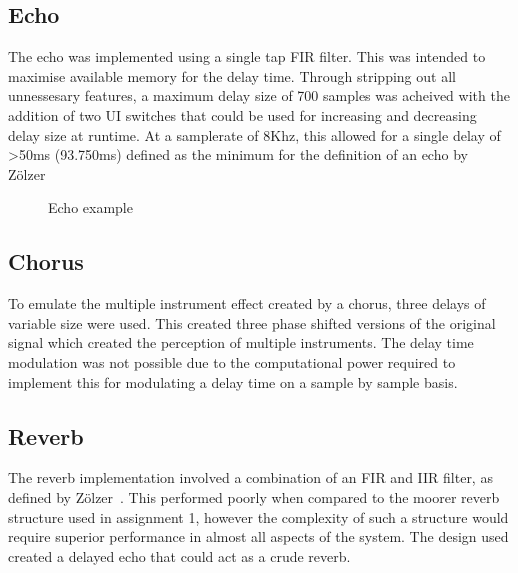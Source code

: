 \documentclass[titlepage]{scrartcl}
\begin{document}
    \subsection{Echo}
    The echo was implemented using a single tap FIR filter. This was intended
    to maximise available memory for the delay time. Through stripping out all
    unnessesary features, a maximum delay size of 700 samples was acheived with
    the addition of two UI switches that could be used for increasing and
    decreasing delay size at runtime.  At a samplerate of 8Khz, this allowed
    for a single delay of \textgreater50ms (93.750ms) defined as the minimum
    for the definition of an echo
    by Z{\"o}lzer~\citeyearpar[p.]{zolzer2011dafx}

    \begin{figure}[H]
        \caption{Echo example}
    \end{figure}

    \subsection{Chorus}
    To emulate the multiple instrument effect created by a chorus, three delays
    of variable size were used. This created three phase shifted versions of the
    original signal which created the perception of multiple instruments. The
    delay time modulation was not possible due to the computational power
    required to implement this for modulating a delay time on a sample by
    sample basis.

    \subsection{Reverb}
    The reverb implementation involved a combination of an FIR and IIR filter,
    as defined by Z{\"o}lzer~\citeyearpar{zolzer2011dafx}. This performed
    poorly when compared to the moorer reverb structure used in assignment 1,
    however the complexity of such a structure would require superior
    performance in almost all aspects of the system.
    The design used created a delayed echo that could act as a crude reverb.
\end{document}
